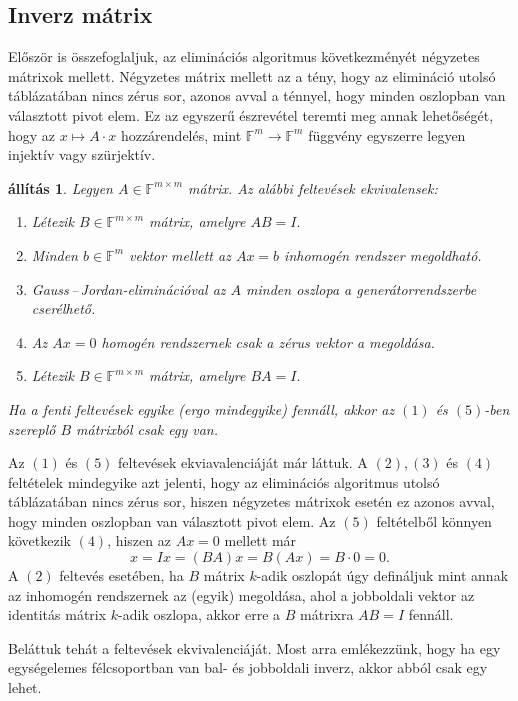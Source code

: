 \documentclass[a4paper, showtrims]{memoir}
\makeatletter
\renewenvironment{proof}[1][\proofname]
    {\par\pushQED{\qed}%
    \normalfont \topsep6\p@\@plus6\p@\relax
    \trivlist
    \item[\hskip\labelsep
        \itshape
    #1\@addpunct{:}]\ignorespaces}
    {\popQED\endtrivlist\@endpefalse}
\theoremstyle{plain}
\newtheorem{proposition}{állítás}[chapter]
\theoremstyle{remark}
\theoremstyle{definition}
\makeatother
\begin{document}
\subsection{Inverz mátrix}
Először is összefoglaljuk, az eliminációs algoritmus következményét négyzetes mátrixok mellett.
Négyzetes mátrix mellett az a tény, hogy az elimináció utolsó táblázatában nincs zérus sor, 
azonos avval a ténnyel,
hogy minden oszlopban van választott pivot elem.
Ez az egyszerű észrevétel teremti meg annak lehetőségét, hogy az $x\mapsto A\cdot x$ hozzárendelés, mint $\mathbb{F}^m\to\mathbb{F}^m$ függvény egyszerre legyen injektív vagy szürjektív.
\begin{proposition}
	Legyen $A\in\mathbb{F}^{m\times m}$ mátrix. Az alábbi feltevések ekvivalensek:
	\begin{enumerate}
		\item
		      Létezik $B\in\mathbb{F}^{m\times m}$ mátrix, amelyre
		      \begin{math}
			      AB=I.
		      \end{math}
        \item
            Minden $b\in\mathbb{F}^m$ vektor mellett az $Ax=b$ inhomogén rendszer megoldható.
		\item
		      Gauss\,--\,Jordan-eliminációval  
              az $A$ minden oszlopa a generátorrendszerbe cserélhető.
        \item 
            Az $Ax=0$ homogén rendszernek csak a zérus vektor a megoldása.
		\item
		      Létezik $B\in\mathbb{F}^{m\times m}$ mátrix, amelyre
		      \begin{math}
			      BA=I.
		      \end{math}
	\end{enumerate}
	Ha a fenti feltevések egyike (ergo mindegyike) fennáll,
	akkor az $(1)$ és $(5)$-ben szereplő $B$ mátrixból csak egy van.
\end{proposition}
\begin{proof}
    Az $(1)$ és $(5)$ feltevések ekviavalenciáját már láttuk.
    A $(2),(3)$ és $(4)$ feltételek mindegyike azt jelenti, 
    hogy az eliminációs algoritmus utolsó táblázatában nincs zérus sor, 
    hiszen négyzetes mátrixok esetén ez azonos avval, 
    hogy minden oszlopban van választott pivot elem.
    Az $(5)$ feltételből könnyen következik $(4)$, hiszen az $Ax=0$ mellett már
    \[
        x=Ix=\left( BA \right)x=B(Ax)=B\cdot 0=0.
    \]
    A $(2)$ feltevés esetében, 
    ha $B$ mátrix $k$-adik oszlopát úgy defináljuk 
    mint annak az inhomogén rendszernek az (egyik) megoldása, 
    ahol a jobboldali vektor az identitás mátrix $k$-adik oszlopa, 
    akkor erre a $B$ mátrixra $AB=I$ fennáll.

Beláttuk tehát a feltevések ekvivalenciáját. 
Most arra emlékezzünk, hogy ha egy egységelemes félcsoportban van bal- és jobboldali inverz,
akkor abból csak egy lehet.
\end{proof}
\end{document}
